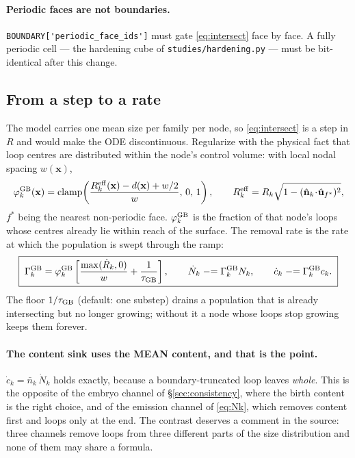 \documentclass[11pt]{article}
\newcommand{\fbk}{\discretionary{}{}{}}   %
\newcommand{\file}[1]{\texttt{\small #1}}
\begin{document}
\paragraph{Periodic faces are not boundaries.}
\verb|BOUNDARY['periodic_face_ids']| must gate \eqref{eq:intersect} face by
face.  A fully periodic cell --- the hardening cube of
\file{studies/\fbk hardening.\fbk py} --- must be bit-identical after this
change.

\subsection{From a step to a rate}

The model carries one mean size per family per node, so \eqref{eq:intersect}
is a step in $R$ and would make the ODE discontinuous.  Regularize with the
physical fact that loop centres are distributed within the node's control
volume: with local nodal spacing $w(\mathbf x)$,
\begin{equation*}
\varphi_k^{\rm GB}(\mathbf x)
 = \mathrm{clamp}\!\left(
     \frac{R_k^{\rm eff}(\mathbf x)-d(\mathbf x)+w/2}{w},\,0,\,1\right),
\qquad
R_k^{\rm eff}
 =R_k\sqrt{1-(\hat{\mathbf n}_k\!\cdot\!\hat{\mathbf u}_{f^{\ast}})^{2}},
\end{equation*}
$f^{\ast}$ being the nearest non-periodic face.  $\varphi_k^{\rm GB}$ is the
fraction of that node's loops whose centres already lie within reach of the
surface.  The removal rate is the rate at which the population is swept
through the ramp:
\begin{equation}
\boxed{\;
\Gamma_k^{\rm GB}
 = \varphi_k^{\rm GB}\left[\frac{\max(\dot R_k,0)}{w}
   + \frac{1}{\tau_{\rm GB}}\right],
\qquad
\dot N_k \mathrel{-}= \Gamma_k^{\rm GB} N_k,
\qquad
\dot c_k \mathrel{-}= \Gamma_k^{\rm GB} c_k . \;}
\label{eq:gb}
\end{equation}
The floor $1/\tau_{\rm GB}$ (default: one substep) drains a population that is
already intersecting but no longer growing; without it a node whose loops stop
growing keeps them forever.

\paragraph{The content sink uses the MEAN content, and that is the point.}
$\dot c_k = \bar n_k\,\dot N_k$ holds exactly, because a boundary-truncated
loop leaves \emph{whole}.  This is the opposite of the embryo channel of
\S\ref{sec:consistency}, where the birth content is the right choice, and of
the emission channel of \eqref{eq:Nk}, which removes content first and loops
only at the end.  The contrast deserves a comment in the source: three
channels remove loops from three different parts of the size distribution and
none of them may share a formula.
\end{document}
